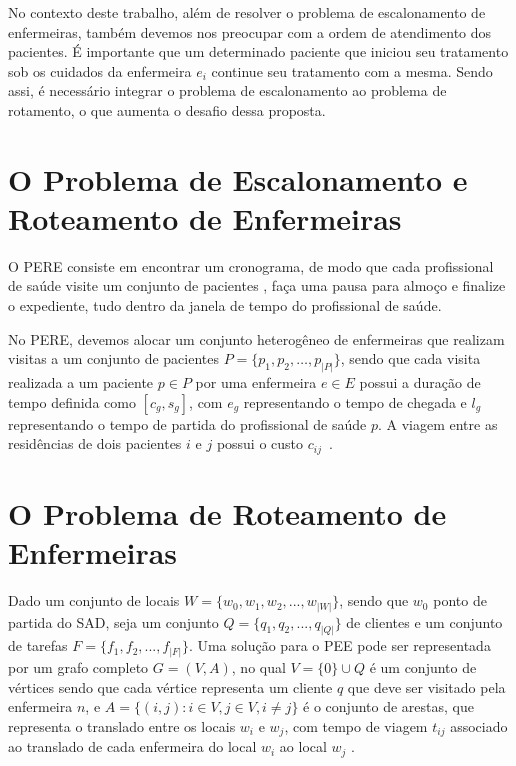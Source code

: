 No contexto deste trabalho, al\'em de resolver o problema de escalonamento de enfermeiras, tamb\'em devemos nos preocupar com a ordem de atendimento dos pacientes. \'E importante que um determinado paciente que iniciou seu tratamento sob os cuidados da enfermeira $e_i$ continue seu tratamento com a mesma. Sendo assi, \'e necess\'ario integrar o problema de escalonamento ao problema de rotamento, o que aumenta o desafio dessa proposta.

\section{O Problema de Escalonamento e Roteamento de Enfermeiras}

O \ac{PERE} consiste em  encontrar um cronograma, de modo que cada profissional de saúde visite um conjunto de pacientes , faça uma pausa para almoço e finalize o expediente, tudo dentro da janela de tempo do profissional de saúde. 

No \ac{PERE}, devemos alocar um conjunto heterogêneo de enfermeiras  que realizam visitas a um conjunto de pacientes  $P = \{ p_1, p_2, \ldots, p_{|P|} \}$, sendo que cada visita realizada a um paciente $p \in P$ por uma enfermeira $e \in E$ possui a duração de tempo definida como $[c_{g}, s_{g}]$, com $e_{g}$ representando o tempo de chegada e $l_{g}$ representando o tempo de partida do profissional de saúde $p$. A viagem entre as residências de dois pacientes $i$ e $j$  possui o custo $c_{ij}$~\cite{rasmussenm:2012}.   



\section{O Problema de Roteamento de Enfermeiras}

Dado um conjunto de locais $W = \{w_0, w_1, w_2, ..., w_{|W|}\}$, sendo que $w_0$ ponto de partida do \ac{SAD}, seja um conjunto $Q = \{q_1, q_2, ..., q_{|Q|}\}$ de clientes e um conjunto de tarefas $F = \{ f_1, f_2, ..., f_{|F|}\}$.  
Uma solução para o \ac{PEE} pode ser representada por um grafo completo $G = (V, A)$, no qual $V = \{0\} \cup Q$ é um conjunto de vértices sendo que cada vértice representa um cliente $q$ que deve ser visitado pela enfermeira $n$, e $A = \{ (i,j): i \in V, j \in V, i \neq j \}$ é o conjunto de arestas, que representa o translado entre os locais $w_i$ e $w_j$, com tempo de viagem $t_{ij}$ associado ao translado de cada enfermeira do local $w_i$ ao local $w_j$ \cite{mansini:2016}.


